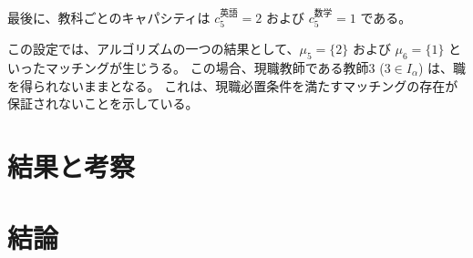 \documentclass[12pt, a4paper]{article}
\newcommand{\source}[1]{\par\noindent{\footnotesize #1}} %
\theoremstyle{definition}
\theoremstyle{remark}
\theoremstyle{plain}
\begin{document}
最後に、教科ごとのキャパシティは $c_5^{\text{英語}} = 2$ および $c_5^{\text{数学}} = 1$ である。

この設定では、アルゴリズムの一つの結果として、$\mu_5 = \{2\}$ および $\mu_6 = \{1\}$ といったマッチングが生じうる。
この場合、現職教師である教師3 ($3 \in I_\alpha$) は、職を得られないままとなる。
これは、現職必置条件を満たすマッチングの存在が保証されないことを示している。





\section{結果と考察}



\section{結論}


\end{document}
